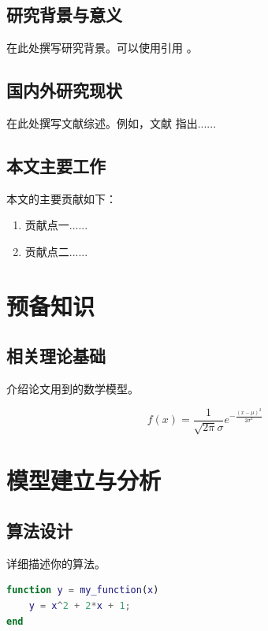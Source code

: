 \documentclass{jluthesis}
\begin{document}
	\subsection{研究背景与意义}
	在此处撰写研究背景。可以使用引用 \cite{ref1}。
	
	\subsection{国内外研究现状}
	在此处撰写文献综述。例如，文献 \cite{ref2} 指出......
	
	\subsection{本文主要工作}
	本文的主要贡献如下：
	\begin{enumerate}[(1)]
		\item 贡献点一......
		\item 贡献点二......
	\end{enumerate}
	
	\section{预备知识}
	
	\subsection{相关理论基础}
	介绍论文用到的数学模型。
	
	\begin{equation}
		f(x) = \frac{1}{\sqrt{2\pi}\sigma} e^{-\frac{(x-\mu)^2}{2\sigma^2}}
		\label{eq:normal_dist}
	\end{equation}
	
	\section{模型建立与分析}
	
	\subsection{算法设计}
	详细描述你的算法。

	\begin{lstlisting}[language=Matlab, caption={Matlab 代码示例}, captionpos=b]
% 这里是代码示例
function y = my_function(x)
	y = x^2 + 2*x + 1;
end
	\end{lstlisting}
	
\end{document}
